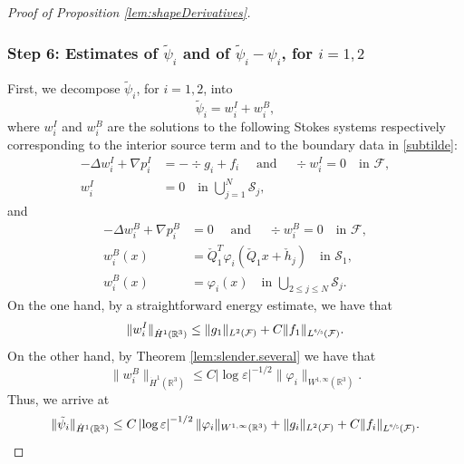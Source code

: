\documentclass[11pt]{article}
\providecommand{\widecheck}{\check}
\newcommand{\R}{\mathbb{R}}
\let\eps\varepsilon
\theoremstyle{definition}
\theoremstyle{remark}
\begin{document}
\begin{proof}[Proof of Proposition \ref{lem:shapeDerivatives}]
\subsubsection*{Step 6: Estimates of $\tilde \psi_i$ and of $\tilde \psi_i - \psi_i$, for $i=1,2$}
First, we decompose $\tilde \psi_i$, for $i=1,2$, into
\[
\tilde \psi_i = w_i^I + w_i^B,\] where $ w_i^I $ and $ w_i^B$ are the solutions to the following Stokes systems respectively corresponding to the interior source term and to the boundary data in \eqref{subtilde}:
\begin{align*}
- \Delta w_i^I + \nabla p_i^I &= -\div g_i + f_i \quad \text{ and } \quad \div w_i^I = 0 \quad \text{in } \mathcal F, \\
w_i^I &= 0 \quad \text{in } \bigcup_{j=1}^N \mathcal S_j,
\end{align*}
and
\begin{align*}
- \Delta w_i^{B} + \nabla p_i^{B} &= 0 \quad \text{ and } \quad \div w_i^{B} = 0 \quad \text{in } \mathcal F, \\
w_i^{B}(x) &= \widecheck Q_1^T \varphi_i(\widecheck Q_1 x + \widecheck h_j)\quad \text{in } \mathcal S_1, \\
w_i^{B}(x) &= \varphi_i(x) \quad \text{in } \bigcup_{2 \leq j \leq N} \mathcal S_j.
\end{align*}
On the one hand, by a straightforward energy estimate, we have that
\begin{equation*}
\| w^I_i \|_{\dot H^1(\R^3)} \leq \|g_1\|_{L^2 (\mathcal F)} + C \|f_1\|_{L^{\sfrac 6 5 }(\mathcal F)}.
\end{equation*}
On the other hand, by Theorem \ref{lem:slender.several}
we have that
\begin{equation*}
\| w_i^{B} \|_{\dot H^1 (\R^3)} \leq C \left|\log \eps\right|^{-1/2}\| \varphi_i\|_{W^{1,\infty}(\R^3)}.
\end{equation*}
Thus, we arrive at
\begin{equation}
\label{midi2}
\|\tilde \psi_i\|_{\dot H^1(\R^3)} \leq C \left|\log \eps\right|^{-1/2}\| \varphi_i\|_{W^{1,\infty} (\R^3)} + \| g_i\|_{L^2(\mathcal F)} + C \|f_i\|_{L^{\sfrac 6 5 }(\mathcal F)}.
\end{equation}


\end{proof}
\end{document}
